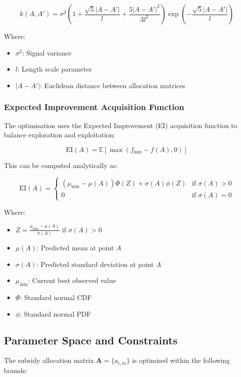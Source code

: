 \begin{equation}
k(A, A') = \sigma^2 \left(1 + \frac{\sqrt{5}|A-A'|}{l} + \frac{5|A-A'|^2}{3l^2}\right) \exp\left(-\frac{\sqrt{5}|A-A'|}{l}\right)
\end{equation}

Where:
\begin{itemize}
    \item $\sigma^2$: Signal variance
    \item $l$: Length scale parameter
    \item $|A-A'|$: Euclidean distance between allocation matrices
\end{itemize}

\subsubsection{Expected Improvement Acquisition Function}
The optimisation uses the Expected Improvement (EI) acquisition function to balance exploration and exploitation:

\begin{equation}
\text{EI}(A) = \mathbb{E}[\max(f_{\min} - f(A), 0)]
\end{equation}

This can be computed analytically as:

\begin{equation}
\text{EI}(A) = 
\begin{cases}
(\mu_{\min} - \mu(A))\Phi(Z) + \sigma(A)\phi(Z) & \text{if } \sigma(A) > 0 \\
0 & \text{if } \sigma(A) = 0
\end{cases}
\end{equation}

Where:
\begin{itemize}
    \item $Z = \frac{\mu_{\min} - \mu(A)}{\sigma(A)}$ if $\sigma(A) > 0$
    \item $\mu(A)$: Predicted mean at point $A$
    \item $\sigma(A)$: Predicted standard deviation at point $A$
    \item $\mu_{\min}$: Current best observed value
    \item $\Phi$: Standard normal CDF
    \item $\phi$: Standard normal PDF
\end{itemize}

\subsection{Parameter Space and Constraints}
The subsidy allocation matrix $\mathbf{A} = \{a_{i,m}\}$ is optimised within the following bounds:

